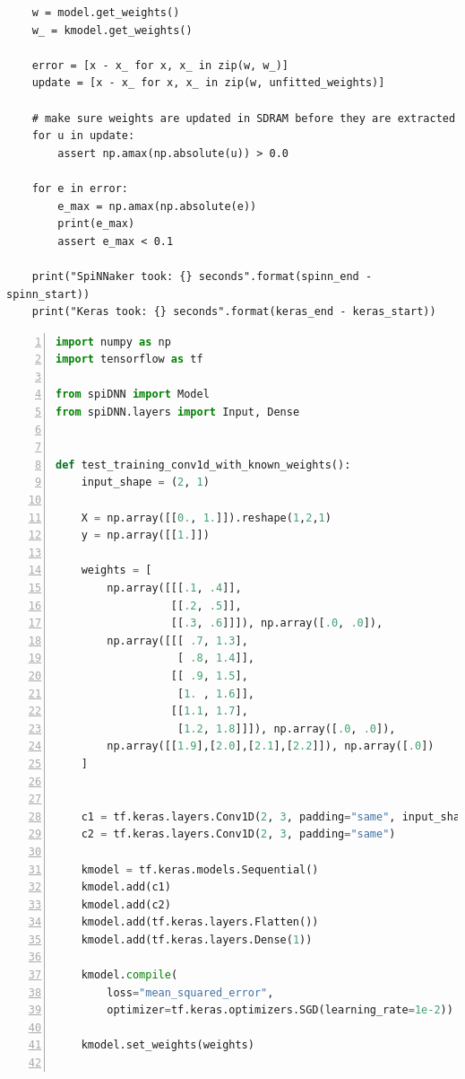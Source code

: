 \documentclass[]{article}
\begin{document}
\begin{appendices}
\begin{lstlisting}
    w = model.get_weights()
    w_ = kmodel.get_weights()

    error = [x - x_ for x, x_ in zip(w, w_)]
    update = [x - x_ for x, x_ in zip(w, unfitted_weights)]

    # make sure weights are updated in SDRAM before they are extracted
    for u in update:
        assert np.amax(np.absolute(u)) > 0.0

    for e in error:
        e_max = np.amax(np.absolute(e))
        print(e_max)
        assert e_max < 0.1

    print("SpiNNaker took: {} seconds".format(spinn_end - spinn_start))
    print("Keras took: {} seconds".format(keras_end - keras_start))
\end{lstlisting}

\newpage

\begin{lstlisting}[language=Python, caption={Excerpt from the test
  suite showing the training of a CNN with known weights.
  It was used for implementing backpropagation for convolutional
  layer.}, captionpos=b, numbers=left,
  label={lst:cnn_known_weights}]
import numpy as np
import tensorflow as tf

from spiDNN import Model
from spiDNN.layers import Input, Dense


def test_training_conv1d_with_known_weights():
    input_shape = (2, 1)

    X = np.array([[0., 1.]]).reshape(1,2,1)
    y = np.array([[1.]])

    weights = [
        np.array([[[.1, .4]],
                  [[.2, .5]],
                  [[.3, .6]]]), np.array([.0, .0]),
        np.array([[[ .7, 1.3],
                   [ .8, 1.4]],
                  [[ .9, 1.5],
                   [1. , 1.6]],
                  [[1.1, 1.7],
                   [1.2, 1.8]]]), np.array([.0, .0]),
        np.array([[1.9],[2.0],[2.1],[2.2]]), np.array([.0])
    ]


    c1 = tf.keras.layers.Conv1D(2, 3, padding="same", input_shape=input_shape)
    c2 = tf.keras.layers.Conv1D(2, 3, padding="same")

    kmodel = tf.keras.models.Sequential()
    kmodel.add(c1)
    kmodel.add(c2)
    kmodel.add(tf.keras.layers.Flatten())
    kmodel.add(tf.keras.layers.Dense(1))

    kmodel.compile(
        loss="mean_squared_error",
        optimizer=tf.keras.optimizers.SGD(learning_rate=1e-2))

    kmodel.set_weights(weights)


\end{lstlisting}
\end{appendices}
\end{document}
